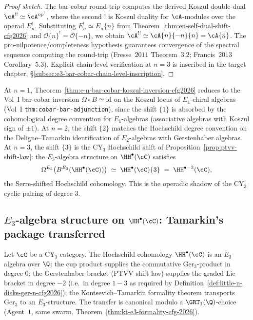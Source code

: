 \begin{proof}[Proof sketch]
The bar-cobar round-trip computes the derived Koszul double-dual
$\cA^{!!} \simeq \cA^{\mathrm{op}^!}$, where the second $!$ is Koszul
duality for $\cA$-modules over the operad $E_n^!$. Substituting
$E_n^! \simeq E_n\{n\}$ from
Theorem~\textup{\ref{thm:en-self-dual-shift-cfg2026}} and
$\mathcal{O}\{n\}^! = \mathcal{O}\{-n\}$, we obtain
$\cA^{!!} \simeq \cA\{n\}\{-n\}\{n\} = \cA\{n\}$. The
pro-nilpotence/completeness hypothesis guarantees convergence of the
spectral sequence computing the round-trip
(Fresse~$2011$ Theorem~$3.2$; Francis~$2013$ Corollary~$5.3$).
Explicit chain-level verification at $n = 3$ is inscribed in the target
chapter, \S\textup{\ref{subsec:e3-bar-cobar-chain-level-inscription}}.
\end{proof}

\begin{remark}
\label{rem:agent-11-vol-1-bar-cobar-compare-cfg2026}
At $n = 1$, Theorem~\textup{\ref{thm:e-n-bar-cobar-koszul-inversion-cfg2026}}
reduces to the Vol~I bar-cobar inversion
$\Omega \circ B \simeq \mathrm{id}$ on the Koszul locus of $E_1$-chiral
algebras (Vol~I \texttt{thm:cobar-bar-adjunction}), since the shift
$\{1\}$ is absorbed by the cohomological degree convention for
$E_1$-algebras (associative algebras with Koszul sign of $\pm 1$). At
$n = 2$, the shift $\{2\}$ matches the Hochschild degree convention on
the Deligne--Tamarkin identification of $E_2$-algebras with
Gerstenhaber algebras. At $n = 3$, the shift $\{3\}$ is the CY$_3$
Hochschild shift of Proposition~\textup{\ref{prop:ptvv-shift-law}}: the
$E_3$-algebra structure on $\HH^\bullet(\cC)$ satisfies
\[
 \Omega^{E_3}\bigl(B^{E_3}(\HH^\bullet(\cC))\bigr)
 \;\simeq\; \HH^\bullet(\cC)\{3\}
 \;=\; \HH^{\bullet - 3}(\cC),
\]
the Serre-shifted Hochschild cohomology. This is the operadic shadow of
the CY$_3$ cyclic pairing of degree $3$.
\end{remark}

\subsection*{$E_3$-algebra structure on $\HH^\bullet(\cC)$: Tamarkin's package transferred}

\begin{proposition}
\label{prop:e3-alg-HH-cfg2026}
\ClaimStatusProvedHere
Let $\cC$ be a CY$_3$ category. The Hochschild cohomology
$\HH^\bullet(\cC)$ is an $E_3$-algebra over $\Q$: the cup product
supplies the commutative $\mathrm{Ger}_3$-product in degree $0$; the
Gerstenhaber bracket (PTVV shift law) supplies the graded Lie bracket
in degree $-2$ (i.e.\ in degree $1 - 3$ as required by
Definition~\textup{\ref{def:little-n-disks-ger-n-cfg2026}}); the
Kontsevich--Tamarkin formality theorem transports $\mathrm{Ger}_3$ to an
$E_3$-structure. The transfer is canonical modulo a $\GRT_1(\Q)$-choice
(Agent~$1$, same swarm, Theorem~\ref{thm:kt-e3-formality-cfg-2026}).
\end{proposition}

